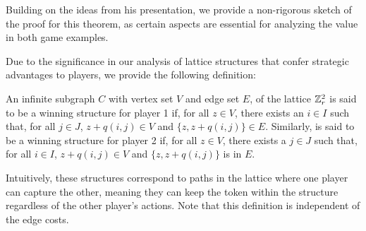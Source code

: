         Building on the ideas from his presentation, we provide a non-rigorous sketch of the proof for this theorem, as certain aspects are essential for analyzing the value in both game examples.

        Due to the significance in our analysis of lattice structures that confer strategic advantages to players, we provide the following definition:

        \begin{definition}\label{def-right-structure-game1}
            An infinite subgraph $C$ with vertex set $V$ and edge set $E$, of the lattice $\mathbb{Z}_r^2$ is said to be a winning structure for player 1 if, for all $z \in V$, there exists an $i \in I$ such that, for all $j \in J$, $z + q(i, j) \in V$ and $\{z, z + q(i, j)\} \in E$. Similarly, is said to be a winning structure for player 2 if, for all $z \in V$, there exists a $j\in J$ such that, for all $i \in I$, $z + q(i, j) \in V$ and $\{z, z + q(i, j)\}$ is in $E$.
        \end{definition}

        Intuitively, these structures correspond to paths in the lattice where one player can capture the other, meaning they can keep the token within the structure regardless of the other player's actions. Note that this definition is independent of the edge costs.

